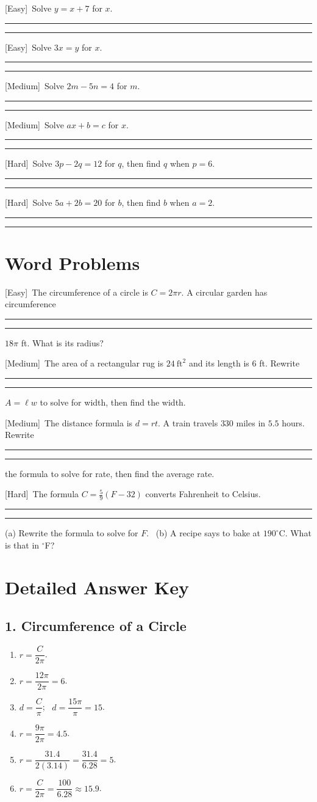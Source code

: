 \documentclass[11pt]{article}
\newcommand{\E}{\textcolor{levE}{\small[Easy]}\ }
\newcommand{\M}{\textcolor{levM}{\small[Medium]}\ }
\newcommand{\Hd}{\textcolor{levH}{\small[Hard]}\ }
\newcommand{\twolines}{\par\vspace{0.7cm}%
  \textcolor{gray!55}{\rule{\linewidth}{0.3pt}}\par\vspace{0.7cm}%
  \textcolor{gray!55}{\rule{\linewidth}{0.3pt}}\par\vspace{2mm}}
\begin{document}
\begin{prob}
\item \E Solve $y = x + 7$ for $x$. \twolines
\item \E Solve $3x = y$ for $x$. \twolines
\item \M Solve $2m - 5n = 4$ for $m$. \twolines
\item \M Solve $ax + b = c$ for $x$. \twolines
\item \Hd Solve $3p - 2q = 12$ for $q$, then find $q$ when $p = 6$. \twolines
\item \Hd Solve $5a + 2b = 20$ for $b$, then find $b$ when $a = 2$. \twolines
\end{prob}

\section{Word Problems}
\begin{prob}
\item \E The circumference of a circle is $C = 2\pi r$. A circular garden has circumference \twolines
$18\pi$ ft. What is its radius?
\item \M The area of a rectangular rug is $24\ \text{ft}^2$ and its length is $6$ ft. Rewrite \twolines
$A = \ell w$ to solve for width, then find the width.
\item \M The distance formula is $d = rt$. A train travels $330$ miles in $5.5$ hours. Rewrite \twolines
the formula to solve for rate, then find the average rate.
\item \Hd The formula $C = \tfrac{5}{9}(F - 32)$ converts Fahrenheit to Celsius. \twolines
(a) Rewrite the formula to solve for $F$. \ (b) A recipe says to bake at $190^\circ$C.
What is that in $^\circ$F?
\end{prob}

\newpage
\section{Detailed Answer Key}

\subsection*{1. Circumference of a Circle}
\begin{enumerate}[label=\arabic*.,leftmargin=2em,itemsep=2pt]
\item $r = \dfrac{C}{2\pi}$.
\item $r = \dfrac{12\pi}{2\pi} = 6$.
\item $d = \dfrac{C}{\pi}$; \ $d = \dfrac{15\pi}{\pi} = 15$.
\item $r = \dfrac{9\pi}{2\pi} = 4.5$.
\item $r = \dfrac{31.4}{2(3.14)} = \dfrac{31.4}{6.28} = 5$.
\item $r = \dfrac{C}{2\pi} = \dfrac{100}{6.28} \approx 15.9$.
\end{enumerate}
\end{document}
